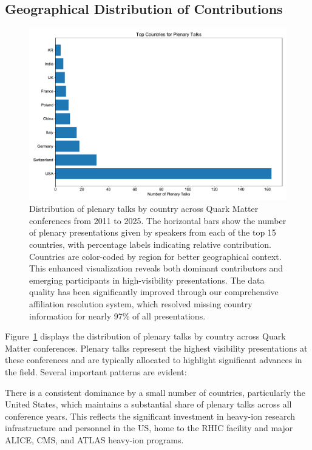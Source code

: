 \documentclass[a4paper,11pt]{article}
\begin{document}
\subsection{Geographical Distribution of Contributions}

\begin{figure}[H]
\centering
\includegraphics[width=\textwidth]{figures/plenary_talks_by_country.pdf}
\caption{Distribution of plenary talks by country across Quark Matter conferences from 2011 to 2025. The horizontal bars show the number of plenary presentations given by speakers from each of the top 15 countries, with percentage labels indicating relative contribution. Countries are color-coded by region for better geographical context. This enhanced visualization reveals both dominant contributors and emerging participants in high-visibility presentations. The data quality has been significantly improved through our comprehensive affiliation resolution system, which resolved missing country information for nearly 97\% of all presentations.}
\label{fig:country_plenary}
\end{figure}

Figure~\ref{fig:country_plenary} displays the distribution of plenary talks by country across Quark Matter conferences. Plenary talks represent the highest visibility presentations at these conferences and are typically allocated to highlight significant advances in the field. Several important patterns are evident:

There is a consistent dominance by a small number of countries, particularly the United States, which maintains a substantial share of plenary talks across all conference years. This reflects the significant investment in heavy-ion research infrastructure and personnel in the US, home to the RHIC facility and major ALICE, CMS, and ATLAS heavy-ion programs.
\end{document}

